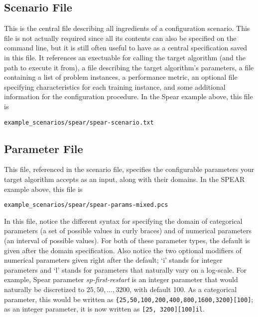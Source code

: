 \documentclass[11pt,letterpaper,twoside]{article}
\begin{document}
\subsection{Scenario File}
This is the central file describing all ingredients of a configuration scenario.
This file is not actually required since all its contents can also be specified on the command line, but it is still often useful to have as a central specification saved in this file. It references an exectuable for calling the target algorithm (and the path to execute it from), a file describing the target algorithm's parameters, a file containing a list of problem instances, a performance metric, an optional file specifying characteristics for each training instance, and some additional information for the configuration procedure. In the Spear example above, this file is

{\footnotesize
\begin{alltt}
example_scenarios/spear/spear-scenario.txt
\end{alltt}}

\subsection{Parameter File}
This file, referenced in the scenario file, specifies the configurable parameters your target algorithm accepts as an input, along with their domains. In the SPEAR example above, this file is 

{\footnotesize
\begin{alltt}
example_scenarios/spear/spear-params-mixed.pcs
\end{alltt}
}

In this file, notice the different syntax for specifying the domain of categorical parameters (a set of possible values in curly braces) and of numerical parameters (an interval of possible values). For both of these parameter types, the default is given after the domain specification. Also notice the two optional modifiers of numerical parameters given right after the default; `i' stands for integer parameters and `l' stands for parameters that naturally vary on a log-scale. For example, Spear parameter \emph{sp-first-restart} is an integer parameter that would naturally be discretized to $25, 50, \dots, 3200$, with default 100. As a categorical parameter, this would be written as {\footnotesize\texttt{\{25,50,100,200,400,800,1600,3200\}[100]}}; as an integer parameter, it is now written as {\footnotesize\texttt{[25, 3200][100]il}}.
\end{document}
